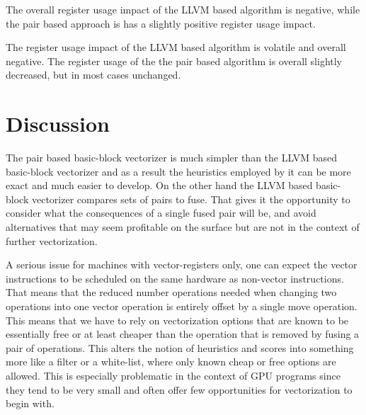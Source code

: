 \documentclass[12pt,a4paper,onecolumn,twoside,openright]{report}
\begin{document}
The overall register usage impact of the LLVM based algorithm is negative, while the pair based approach is has a slightly positive register usage impact.


\begin{center}
\end{center}

The register usage impact of the LLVM based algorithm is volatile and overall negative.
The register usage of the the pair based algorithm is overall slightly decreased, but in most cases unchanged.


\chapter{Discussion}
 \label{chap:discussion}

The pair based basic-block vectorizer is much simpler than the LLVM based basic-block vectorizer and as a result the heuristics employed by it can be more exact and much easier to develop. On the other hand the LLVM based basic-block vectorizer compares sets of pairs to fuse. That gives it the opportunity to consider what the consequences of a single fused pair will be, and avoid alternatives that may seem profitable on the surface but are not in the context of further vectorization.


A serious issue for machines with vector-registers only, one can expect the vector instructions to be scheduled on the same hardware as non-vector instructions. That means that the reduced number operations needed when changing two operations into one vector operation is entirely offset by a single move operation. This means that we have to rely on vectorization options that are known to be essentially free or at least cheaper than the operation that is removed by fusing a pair of operations. This alters the notion of heuristics and scores into something more like a filter or a white-list, where only known cheap or free options are allowed. This is especially problematic in the context of GPU programs since they tend to be very small and often offer few opportunities for vectorization to begin with.
\end{document}
